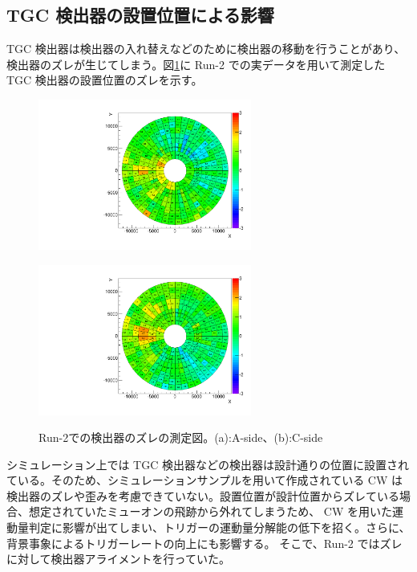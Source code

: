 \subsection{TGC 検出器の設置位置による影響}
TGC 検出器は検出器の入れ替えなどのために検出器の移動を行うことがあり、検出器のズレが生じてしまう。図\ref{fig:ズレ}に Run-2 での実データを用いて測定した TGC 検出器の設置位置のズレを示す。
\begin{figure}
    \begin{minipage}[tb]{0.4\linewidth}
        \centering
        \includegraphics[clip, width=7cm]{fig/3/TGCAlign_CW.muon.bias.20160606.v1.A-side.pdf}
        \vspace{10pt}
        \subcaption{}
        \label{}
    \end{minipage}
    \hfill
    \begin{minipage}[tb]{0.4\linewidth}
        \centering
        \includegraphics[clip, width=7cm]{fig/3/TGCAlign_CW.muon.bias.20160606.v1.C-side.pdf}
        \vspace{10pt}
        \subcaption{}
        \label{}
    \end{minipage}
    \caption{Run-2での検出器のズレの測定図。(a):A-side、(b):C-side}
    \label{fig:ズレ}
\end{figure}
シミュレーション上では TGC 検出器などの検出器は設計通りの位置に設置されている。そのため、シミュレーションサンプルを用いて作成されている CW は検出器のズレや歪みを考慮できていない。設置位置が設計位置からズレている場合、想定されていたミューオンの飛跡から外れてしまうため、 CW を用いた運動量判定に影響が出てしまい、トリガーの運動量分解能の低下を招く。さらに、背景事象によるトリガーレートの向上にも影響する。
そこで、Run-2 ではズレに対して検出器アライメントを行っていた。

